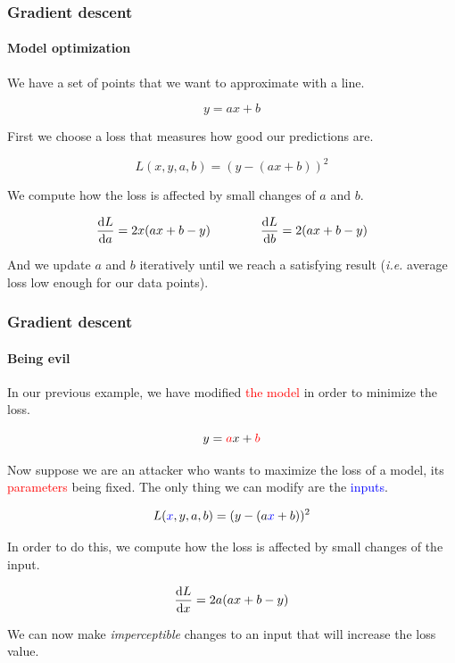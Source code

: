 \documentclass[9pt]{beamer}
\begin{document}
\begin{frame}
  \frametitle{Gradient descent}

  \framesubtitle{Model optimization}

  \begin{center}
    \scalebox{0.5}{
      
    }
  \end{center}

  We have a set of points that we want to approximate with a line.

  \[
  y = ax + b
  \]

  \pause

  First we choose a loss that measures how good our predictions are.

  \[
  L(x, y, a, b) = (y - (a x + b))^{2}
  \]

  \pause

  We compute how the loss is affected by small changes of $a$ and $b$.

  \[
  \frac{\mathrm{d} L}{\mathrm{d} a} = 2 x (ax + b - y) \qquad \qquad
  \frac{\mathrm{d} L}{\mathrm{d} b} = 2 (ax + b - y)
  \]

  And we update $a$ and $b$ iteratively until we reach a satisfying
  result (\textit{i.e.} average loss low enough for our data points).

\end{frame}

\begin{frame}
  \frametitle{Gradient descent}

  \framesubtitle{Being evil}

  \vspace{-0.5cm}

  \begin{center}
    \scalebox{0.5}{
      
    }
  \end{center}

  In our previous example, we have modified \textcolor{red}{the model}
  in order to minimize the loss.

  \[
  y = \textcolor{red}{a}x + \textcolor{red}{b}
  \]

  \pause

  Now suppose we are an attacker who wants to maximize the loss of a
  model, its \textcolor{red}{parameters} being fixed. The only thing
  we can modify are the \textcolor{blue}{inputs}.

  \[
  L(\textcolor{blue}{x}, y, a, b) = (y - (a \textcolor{blue}{x} + b))^{2}
  \]

  \pause

  In order to do this, we compute how the loss is affected by small
  changes of the input.

  \[
  \frac{\mathrm{d} L}{\mathrm{d} x} = 2 a (ax + b - y)
  \]

  We can now make \emph{imperceptible} changes to an input that will
  increase the loss value.
\end{frame}
\end{document}
